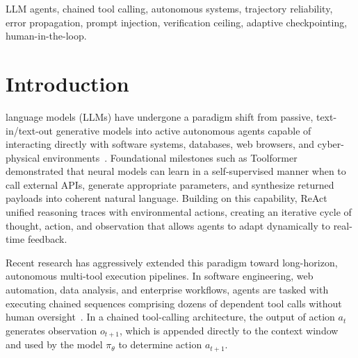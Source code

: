 \documentclass[conference]{IEEEtran}
\begin{document}
\begin{IEEEkeywords}
LLM agents, chained tool calling, autonomous systems, trajectory reliability, error propagation, prompt injection, verification ceiling, adaptive checkpointing, human-in-the-loop.
\end{IEEEkeywords}

\section{Introduction}
 language models (LLMs) have undergone a paradigm shift from passive, text-in/text-out generative models into active autonomous agents capable of interacting directly with software systems, databases, web browsers, and cyber-physical environments~\cite{chowa2026from, wang2024survey}. Foundational milestones such as Toolformer~\cite{schick2023toolformer} demonstrated that neural models can learn in a self-supervised manner when to call external APIs, generate appropriate parameters, and synthesize returned payloads into coherent natural language. Building on this capability, ReAct~\cite{yao2023react} unified reasoning traces with environmental actions, creating an iterative cycle of thought, action, and observation that allows agents to adapt dynamically to real-time feedback.

Recent research has aggressively extended this paradigm toward long-horizon, autonomous multi-tool execution pipelines. In software engineering, web automation, data analysis, and enterprise workflows, agents are tasked with executing chained sequences comprising dozens of dependent tool calls without human oversight~\cite{qin2024toolllm, zhou2024webarena}. In a chained tool-calling architecture, the output of action $a_t$ generates observation $o_{t+1}$, which is appended directly to the context window and used by the model $\pi_\theta$ to determine action $a_{t+1}$.
\end{document}
